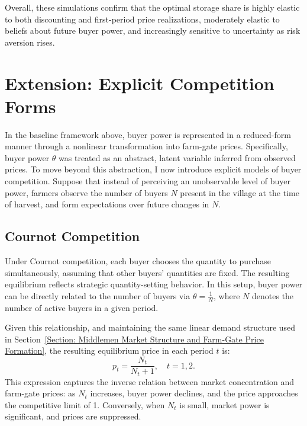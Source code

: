 Overall, these simulations confirm that the optimal storage share is highly elastic to both discounting and first-period price realizations, moderately elastic to beliefs about future buyer power, and increasingly sensitive to uncertainty as risk aversion rises.












\section{Extension: Explicit Competition Forms}
\noindent In the baseline framework above, buyer power is represented in a reduced-form manner through a nonlinear transformation into farm-gate prices. Specifically, buyer power $\theta$ was treated as an abstract, latent variable inferred from observed prices. To move beyond this abstraction, I now introduce explicit models of buyer competition. Suppose that instead of perceiving an unobservable level of buyer power, farmers observe the number of buyers $N$ present in the village at the time of harvest, and form expectations over future changes in $N$.


\subsection{Cournot Competition}
\noindent Under Cournot competition, each buyer chooses the quantity to purchase simultaneously, assuming that other buyers’ quantities are fixed. The resulting equilibrium reflects strategic quantity-setting behavior. In this setup, buyer power can be directly related to the number of buyers via $\theta = \frac{1}{N}$, where $N$ denotes the number of active buyers in a given period.

Given this relationship, and maintaining the same linear demand structure used in Section~\ref{Section: Middlemen Market Structure and Farm-Gate Price Formation}, the resulting equilibrium price in each period $t$ is:
\begin{equation}
    p_t = \frac{N_t}{N_t + 1}, \quad t = 1,2.
\end{equation}
\noindent This expression captures the inverse relation between market concentration and farm-gate prices: as $N_t$ increases, buyer power declines, and the price approaches the competitive limit of 1. Conversely, when $N_t$ is small, market power is significant, and prices are suppressed.




